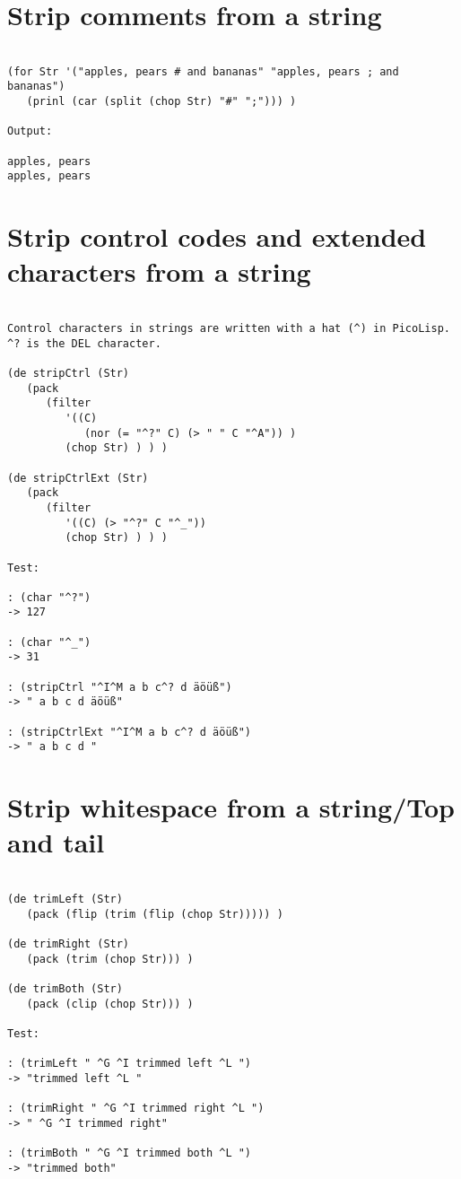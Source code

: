 \section*{Strip comments from a string}

\begin{verbatim}

(for Str '("apples, pears # and bananas" "apples, pears ; and bananas")
   (prinl (car (split (chop Str) "#" ";"))) )

Output:

apples, pears
apples, pears

\end{verbatim}

\section*{Strip control codes and extended characters from a string}

\begin{verbatim}

Control characters in strings are written with a hat (^) in PicoLisp.
^? is the DEL character.

(de stripCtrl (Str)
   (pack
      (filter
         '((C)
            (nor (= "^?" C) (> " " C "^A")) )
         (chop Str) ) ) )

(de stripCtrlExt (Str)
   (pack
      (filter
         '((C) (> "^?" C "^_"))
         (chop Str) ) ) )

Test:

: (char "^?")
-> 127

: (char "^_")
-> 31

: (stripCtrl "^I^M a b c^? d äöüß")
-> " a b c d äöüß"

: (stripCtrlExt "^I^M a b c^? d äöüß")
-> " a b c d "

\end{verbatim}

\section*{Strip whitespace from a string/Top and tail}

\begin{verbatim}

(de trimLeft (Str)
   (pack (flip (trim (flip (chop Str))))) )

(de trimRight (Str)
   (pack (trim (chop Str))) )

(de trimBoth (Str)
   (pack (clip (chop Str))) )

Test:

: (trimLeft " ^G ^I trimmed left ^L ")
-> "trimmed left ^L "

: (trimRight " ^G ^I trimmed right ^L ")
-> " ^G ^I trimmed right"

: (trimBoth " ^G ^I trimmed both ^L ")
-> "trimmed both"

\end{verbatim}

